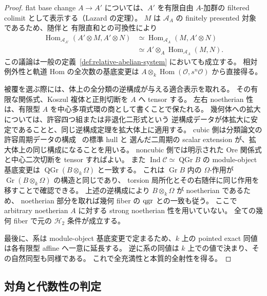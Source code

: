 \begin{proof}
flat base change $A\to A'$ については、$A'$ を有限自由 $A$-加群の
filtered colimit として表示する（Lazard の定理）。
$M$ は $\mathcal A_A$ の finitely presented 対象であるため、随伴と
有限直和との可換性により
\[
 \begin{aligned}
 \operatorname{Hom}_{\mathcal A_{A'}}(A'\otimes M,A'\otimes N)
  &\simeq\operatorname{Hom}_{\mathcal A_A}(M,A'\otimes N)\\
  &\simeq A'\otimes_A\operatorname{Hom}_{\mathcal A_A}(M,N).
 \end{aligned}
\]
この議論は一般の定義~\ref{def:relative-abelian-system} においても成立する。
相対例外性と軌道 Hom の全次数の基底変更は
$A\otimes_k\operatorname{Hom}(\mathcal O,s^n\mathcal O)$ から直接得る。

被覆を選ぶ際には、体上の全分類の逆構成が与える適合表示を取れる。
その有限な関係式、Koszul 複体と正則切断を $A$ へ tensor する。
左右 noetherian 性は、有限型 $A$ を中心多項式環の商として書くことで保たれる。
幾何体への拡大については、許容四つ組または非退化二形式という
逆構成データが体拡大に安定であることと、同じ逆構成定理を拡大体上に適用する。
cubic 側は分類論文の許容周期データの構成~\cite[許容周期データの構成]{QuadricIntrinsic2026} の標準 hull と
選んだ二周期の scalar extension が、拡大体上の同じ構成になることを用いる。
noncubic 側では明示された Ore 関係式と中心二次切断を tensor すればよい。
また $\operatorname{Ind}\mathcal C\simeq\operatorname{QGr}B$ の
module-object 基底変更は $\operatorname{QGr}(B\otimes_k\Omega)$ と一致する。
これは $\operatorname{Gr}B$ 内の $\Omega$-作用が
$\operatorname{Gr}(B\otimes_k\Omega)$ の構造と同じであり、
torsion 局所化とその右随伴に同じ作用を移すことで確認できる。
上述の逆構成により $B\otimes_k\Omega$ が noetherian であるため、
noetherian 部分を取れば幾何 fiber の $\operatorname{qgr}$ との一致も従う。
ここで arbitrary noetherian $A$ に対する strong noetherian 性を用いていない。
全ての幾何 fiber で元の $\mathcal H_2$ 条件が成立する。

最後に、系は module-object 基底変更で定まるため、$k$ 上の pointed exact
同値は各有限型 affine へ一意に延長する。
逆に系の同値は $k$ 上での値で決まり、その自然同型も同様である。
これで全充満性と本質的全射性を得る。
\end{proof}


\subsection{対角と代数性の判定}

